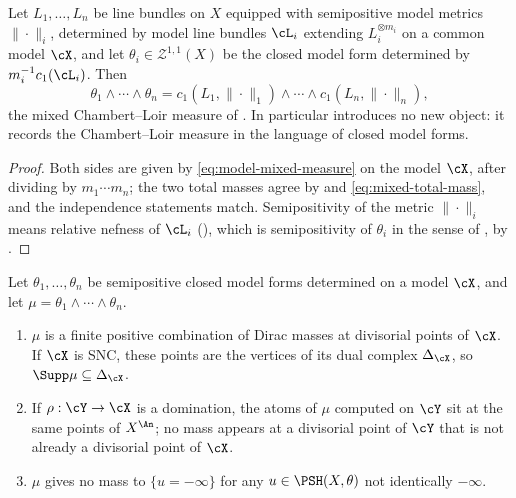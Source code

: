 \begin{corollary}
\label{cor:ch24-cl-identification}
Let $L_1,\ldots,L_n$ be line bundles on $X$ equipped with semipositive
model metrics $\|\cdot\|_i$, determined by model line bundles $\cL_i$
extending $L_i^{\otimes m_i}$ on a common model $\cX$, and let
$\theta_i\in\mathcal Z^{1,1}(X)$ be the closed model form determined by
$m_i^{-1}c_1(\cL_i)$.  Then
\[
 \theta_1\wedge\cdots\wedge\theta_n
 =c_1(L_1,\|\cdot\|_1)\wedge\cdots\wedge c_1(L_n,\|\cdot\|_n),
\]
the mixed Chambert--Loir measure of .  In
particular  introduces no new object: it
records the Chambert--Loir measure in the language of closed model forms.
\end{corollary}

\begin{proof}
Both sides are given by \eqref{eq:model-mixed-measure} on the model $\cX$,
after dividing by $m_1\cdots m_n$; the two total masses agree by
 and \eqref{eq:mixed-total-mass}, and the
independence statements match.  Semipositivity of the metric $\|\cdot\|_i$
means relative nefness of $\cL_i$
(), which is semipositivity of $\theta_i$
in the sense of , by
.
\end{proof}

\begin{proposition}
\label{prop:ch24-model-support}
Let $\theta_1,\ldots,\theta_n$ be semipositive closed model forms
determined on a model $\cX$, and let
$\mu=\theta_1\wedge\cdots\wedge\theta_n$.
\begin{enumerate}
\item\label{itm:ch24-ms:atomic} $\mu$ is a finite positive combination of
 Dirac masses at divisorial points of $\cX$.  If $\cX$ is SNC, these
 points are the vertices of its dual complex $\Delta_{\cX}$, so
 $\Supp\mu\subseteq\Delta_{\cX}$.
\item\label{itm:ch24-ms:refine} If $\rho:\cY\to\cX$ is a domination, the
 atoms of $\mu$ computed on $\cY$ sit at the same points of
 $X^{\An}$; no mass appears at a divisorial point of $\cY$ that is not
 already a divisorial point of $\cX$.
\item\label{itm:ch24-ms:pluripolar} $\mu$ gives no mass to
 $\{u=-\infty\}$ for any $u\in\PSH(X,\theta)$ not identically
 $-\infty$.
\end{enumerate}
\end{proposition}

